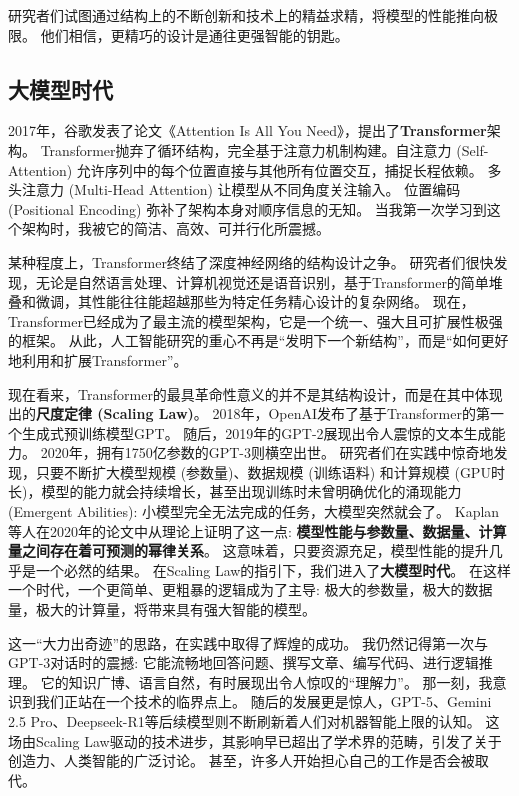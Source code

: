 \documentclass[12pt, a4paper]{article}
\begin{document}
研究者们试图通过结构上的不断创新和技术上的精益求精，将模型的性能推向极限。
他们相信，更精巧的设计是通往更强智能的钥匙。

\subsection{大模型时代}

2017年，谷歌发表了论文《Attention Is All You Need》，提出了\textbf{Transformer}架构。
Transformer抛弃了循环结构，完全基于注意力机制构建。自注意力 (Self-Attention) 允许序列中的每个位置直接与其他所有位置交互，捕捉长程依赖。
多头注意力 (Multi-Head Attention) 让模型从不同角度关注输入。
位置编码 (Positional Encoding) 弥补了架构本身对顺序信息的无知。
当我第一次学习到这个架构时，我被它的简洁、高效、可并行化所震撼。

某种程度上，Transformer终结了深度神经网络的结构设计之争。
研究者们很快发现，无论是自然语言处理、计算机视觉还是语音识别，基于Transformer的简单堆叠和微调，其性能往往能超越那些为特定任务精心设计的复杂网络。
现在，Transformer已经成为了最主流的模型架构，它是一个统一、强大且可扩展性极强的框架。
从此，人工智能研究的重心不再是“发明下一个新结构”，而是“如何更好地利用和扩展Transformer”。

现在看来，Transformer的最具革命性意义的并不是其结构设计，而是在其中体现出的\textbf{尺度定律 (Scaling Law)}。
2018年，OpenAI发布了基于Transformer的第一个生成式预训练模型GPT。
随后，2019年的GPT-2展现出令人震惊的文本生成能力。
2020年，拥有1750亿参数的GPT-3则横空出世。
研究者们在实践中惊奇地发现，只要不断扩大模型规模 (参数量)、数据规模 (训练语料) 和计算规模 (GPU时长)，模型的能力就会持续增长，甚至出现训练时未曾明确优化的涌现能力 (Emergent Abilities): 小模型完全无法完成的任务，大模型突然就会了。
Kaplan等人在2020年的论文中从理论上证明了这一点: \textbf{模型性能与参数量、数据量、计算量之间存在着可预测的幂律关系}。
这意味着，只要资源充足，模型性能的提升几乎是一个必然的结果。
在Scaling Law的指引下，我们进入了\textbf{大模型时代}。
在这样一个时代，一个更简单、更粗暴的逻辑成为了主导: 极大的参数量，极大的数据量，极大的计算量，将带来具有强大智能的模型。

这一“大力出奇迹”的思路，在实践中取得了辉煌的成功。
我仍然记得第一次与GPT-3对话时的震撼: 它能流畅地回答问题、撰写文章、编写代码、进行逻辑推理。
它的知识广博、语言自然，有时展现出令人惊叹的“理解力”。
那一刻，我意识到我们正站在一个技术的临界点上。
随后的发展更是惊人，GPT-5、Gemini 2.5 Pro、Deepseek-R1等后续模型则不断刷新着人们对机器智能上限的认知。
这场由Scaling Law驱动的技术进步，其影响早已超出了学术界的范畴，引发了关于创造力、人类智能的广泛讨论。
甚至，许多人开始担心自己的工作是否会被取代。
\end{document}
